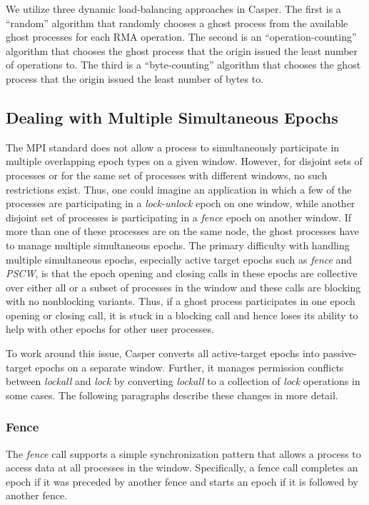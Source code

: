 We utilize three dynamic load-balancing approaches in Casper.  The
first is a ``random'' algorithm that randomly chooses a ghost process
from the available ghost processes for each RMA operation.  The second
is an ``operation-counting'' algorithm that chooses
the ghost process that the origin issued the least number of
operations to.  The third is a ``byte-counting'' algorithm that
chooses the ghost process that the origin issued the least number of
bytes to.


\subsection{Dealing with Multiple Simultaneous Epochs}
\label{sec:multiwin}

The MPI standard does not allow a process to simultaneously
participate in multiple overlapping epoch types on a given window.
However, for disjoint sets of processes or for the same set of
processes with different windows, no such restrictions exist.
Thus, one could imagine an application in which a few of the processes
are participating in a \emph{lock-unlock} epoch on one window, while
another disjoint set of processes is participating in a \emph{fence}
epoch on another window.  If more than one of these processes are on
the same node, the ghost processes have to manage multiple
simultaneous epochs.  The primary difficulty with handling multiple
simultaneous epochs, especially active target epochs such as
\emph{fence} and \emph{PSCW}, is that the epoch opening and closing
calls in these epochs are collective over either all or a subset of
processes in the window and these calls are blocking with no
nonblocking variants.  Thus, if a ghost process participates in one
epoch opening or closing call, it is stuck in a blocking call and hence
loses its ability to help with other epochs for other user processes.

To work around this issue, Casper converts all active-target epochs
into passive-target epochs on a separate window.  Further, it
manages permission conflicts between \emph{lockall} and \emph{lock} by
converting \emph{lockall} to a collection of \emph{lock} operations in
some cases.  The following paragraphs describe these changes in more
detail.

\subsubsection{Fence}  The \emph{fence} call supports a simple
synchronization pattern that allows a process to access data at all
processes in the window.  Specifically, a fence call completes an
epoch if it was preceded by another fence and starts an epoch if it is
followed by another fence.

